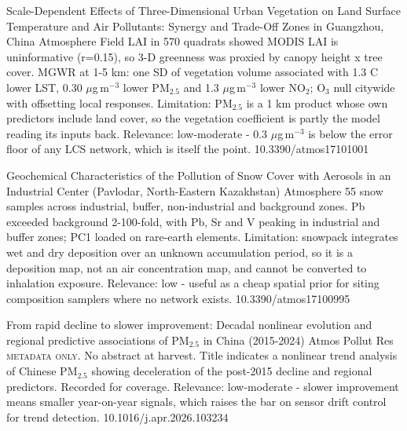 \documentclass[10pt]{article}
\begin{document}
{Scale-Dependent Effects of Three-Dimensional Urban Vegetation on Land Surface Temperature and Air Pollutants: Synergy and Trade-Off Zones in Guangzhou, China}
{Atmosphere}
{Field LAI in 570 quadrats showed MODIS LAI is uninformative (r=0.15), so 3-D greenness was proxied by canopy height x tree cover. MGWR at 1-5 km: one SD of vegetation volume associated with 1.3 C lower LST, 0.30 $\mu$g\,m$^{-3}$ lower PM$_{2.5}$ and 1.3 $\mu$g\,m$^{-3}$ lower NO$_2$; O$_3$ null citywide with offsetting local responses. Limitation: PM$_{2.5}$ is a 1 km product whose own predictors include land cover, so the vegetation coefficient is partly the model reading its inputs back. Relevance: low-moderate - 0.3 $\mu$g\,m$^{-3}$ is below the error floor of any LCS network, which is itself the point.}
{10.3390/atmos17101001}

{Geochemical Characteristics of the Pollution of Snow Cover with Aerosols in an Industrial Center (Pavlodar, North-Eastern Kazakhstan)}
{Atmosphere}
{55 snow samples across industrial, buffer, non-industrial and background zones. Pb exceeded background 2-100-fold, with Pb, Sr and V peaking in industrial and buffer zones; PC1 loaded on rare-earth elements. Limitation: snowpack integrates wet and dry deposition over an unknown accumulation period, so it is a deposition map, not an air concentration map, and cannot be converted to inhalation exposure. Relevance: low - useful as a cheap spatial prior for siting composition samplers where no network exists.}
{10.3390/atmos17100995}

{From rapid decline to slower improvement: Decadal nonlinear evolution and regional predictive associations of PM$_{2.5}$ in China (2015-2024)}
{Atmos Pollut Res}
{\textsc{metadata only.} No abstract at harvest. Title indicates a nonlinear trend analysis of Chinese PM$_{2.5}$ showing deceleration of the post-2015 decline and regional predictors. Recorded for coverage. Relevance: low-moderate - slower improvement means smaller year-on-year signals, which raises the bar on sensor drift control for trend detection.}
{10.1016/j.apr.2026.103234}

\par{}\baselineskip{}\baselineskip
{}
\end{document}

